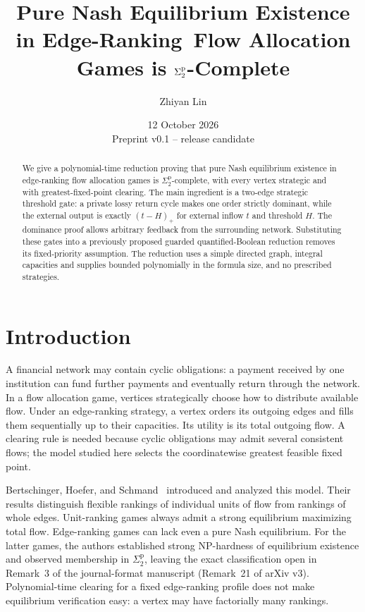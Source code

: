 \documentclass[11pt]{article}
\title{Pure Nash Equilibrium Existence in Edge-Ranking\ Flow Allocation Games is $\sig$-Complete}
\author{Zhiyan Lin}
\date{12 October 2026\\\small Preprint v0.1 -- release candidate}
\newcommand{\sig}{\Sigma^{\mathrm p}_2}
\newcommand{\pos}[1]{(#1)_+}
\begin{document}
\maketitle
\begin{abstract}
We give a polynomial-time reduction proving that pure Nash equilibrium existence in edge-ranking flow allocation games is $\sig$-complete, with every vertex strategic and with greatest-fixed-point clearing. The main ingredient is a two-edge strategic threshold gate: a private lossy return cycle makes one order strictly dominant, while the external output is exactly $\pos{t-H}$ for external inflow $t$ and threshold $H$. The dominance proof allows arbitrary feedback from the surrounding network. Substituting these gates into a previously proposed guarded quantified-Boolean reduction removes its fixed-priority assumption. The reduction uses a simple directed graph, integral capacities and supplies bounded polynomially in the formula size, and no prescribed strategies.
\end{abstract}

\section{Introduction}
A financial network may contain cyclic obligations: a payment received by one institution can fund further payments and eventually return through the network. In a flow allocation game, vertices strategically choose how to distribute available flow. Under an edge-ranking strategy, a vertex orders its outgoing edges and fills them sequentially up to their capacities. Its utility is its total outgoing flow. A clearing rule is needed because cyclic obligations may admit several consistent flows; the model studied here selects the coordinatewise greatest feasible fixed point.

Bertschinger, Hoefer, and Schmand~\cite{bhs} introduced and analyzed this model. Their results distinguish flexible rankings of individual units of flow from rankings of whole edges. Unit-ranking games always admit a strong equilibrium maximizing total flow. Edge-ranking games can lack even a pure Nash equilibrium. For the latter games, the authors established strong NP-hardness of equilibrium existence and observed membership in $\sig$, leaving the exact classification open in Remark~3 of the journal-format manuscript (Remark~21 of arXiv v3). Polynomial-time clearing for a fixed edge-ranking profile does not make equilibrium verification easy: a vertex may have factorially many rankings.
\end{document}
